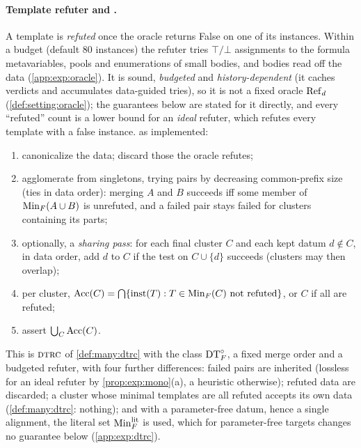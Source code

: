 \paragraph{Template refuter and \DTRC{}.}
A template is \emph{refuted} once the oracle returns False on one of its instances. Within a budget (default $80$ instances) the refuter tries $\top/\bot$ assignments to the formula metavariables, pools and enumerations of small bodies, and bodies read off the data (\cref{app:exp:oracle}). It is sound, \emph{budgeted} and \emph{history-dependent} (it caches verdicts and accumulates data-guided tries), so it is not a fixed oracle $\mathrm{Ref}_d$ (\cref{def:setting:oracle}); the guarantees below are stated for it directly, and every ``refuted'' count is a lower bound for an \emph{ideal} refuter, which refutes every template with a false instance. \DTRC{} as implemented:
\begin{enumerate}[label=(\arabic*),nosep]
\item canonicalize the data; discard those the oracle refutes;
\item agglomerate from singletons, trying pairs by decreasing common-prefix size (ties in data order): merging $A$ and $B$ succeeds iff some member of $\mathrm{Min}_F(A\cup B)$ is unrefuted, and a failed pair stays failed for clusters containing its parts;
\item optionally, a \emph{sharing pass}: for each final cluster $C$ and each kept datum $d\notin C$, in data order, add $d$ to $C$ if the test on $C\cup\{d\}$ succeeds (clusters may then overlap);
\item per cluster, $\mathrm{Acc}(C)=\bigcap\{\mathrm{inst}(T):T\in\mathrm{Min}_F(C)\text{ not refuted}\}$, or $C$ if all are refuted;
\item assert $\bigcup_C\mathrm{Acc}(C)$.
\end{enumerate}
This is $\textsc{dtrc}$ of \cref{def:many:dtrc} with the class $\mathrm{DT}^{\circ}_{F}$, a fixed merge order and a budgeted refuter, with four further differences: failed pairs are inherited (lossless for an ideal refuter by \cref{prop:exp:mono}(a), a heuristic otherwise); refuted data are discarded; a cluster whose minimal templates are all refuted accepts its own data (\cref{def:many:dtrc}: nothing); and with a parameter-free datum, hence a single alignment, the literal set $\mathrm{Min}^{\mathrm{lit}}_F$ is used, which for parameter-free targets changes no guarantee below (\cref{app:exp:dtrc}).

